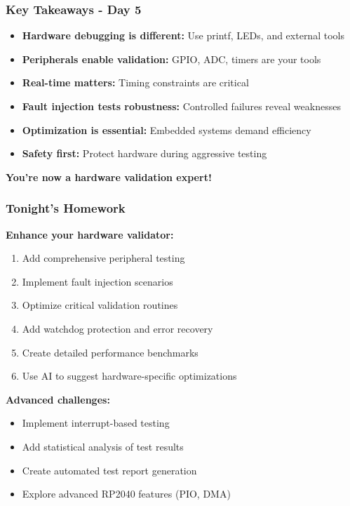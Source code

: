 \documentclass{beamer}
\begin{document}
\begin{frame}
\frametitle{Key Takeaways - Day 5}
\begin{itemize}
    \item \textbf{Hardware debugging is different:} Use printf, LEDs, and external tools
    \item \textbf{Peripherals enable validation:} GPIO, ADC, timers are your tools
    \item \textbf{Real-time matters:} Timing constraints are critical
    \item \textbf{Fault injection tests robustness:} Controlled failures reveal weaknesses
    \item \textbf{Optimization is essential:} Embedded systems demand efficiency
    \item \textbf{Safety first:} Protect hardware during aggressive testing
\end{itemize}

\vspace{0.5cm}
\begin{center}
\textbf{You're now a hardware validation expert!}
\end{center}
\end{frame}

\begin{frame}
\frametitle{Tonight's Homework}
\textbf{Enhance your hardware validator:}
\begin{enumerate}
    \item Add comprehensive peripheral testing
    \item Implement fault injection scenarios
    \item Optimize critical validation routines
    \item Add watchdog protection and error recovery
    \item Create detailed performance benchmarks
    \item Use AI to suggest hardware-specific optimizations
\end{enumerate}

\vspace{0.5cm}
\textbf{Advanced challenges:}
\begin{itemize}
    \item Implement interrupt-based testing
    \item Add statistical analysis of test results
    \item Create automated test report generation
    \item Explore advanced RP2040 features (PIO, DMA)
\end{itemize}
\end{frame}
\end{document}
